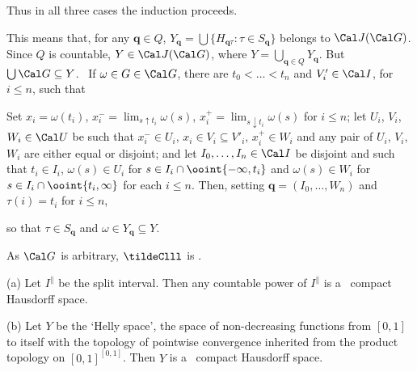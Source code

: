 {Thus in all three cases the induction proceeds.\ \Qed

\medskip

 This means that, for any $\pmb{q}\in Q$,
$Y_{\pmb{q}}=\bigcup\{H_{\pmb{q}\tau}:\tau\in S_{\pmb{q}}\}$ belongs to
$\Cal J(\Cal G)$.   Since $Q$ is countable, $Y\in\Cal J(\Cal G)$, where
$Y=\bigcup_{\pmb{q}\in Q}Y_{\pmb{q}}$.   But $\bigcup\Cal G\subseteq Y$.
\Prf\ If $\omega\in G\in\Cal G$, there are $t_0<\ldots<t_n$ and
$V'_i\in\Cal I$, for $i\le n$, such that


\noindent Set $x_i=\omega(t_i)$, $x^-_i=\lim_{s\uparrow t_i}\omega(s)$,
$x^+_i=\lim_{s\downarrow t_i}\omega(s)$ for $i\le n$;  let $U_i$, $V_i$,
$W_i\in\Cal U$ be such that $x^-_i\in U_i$, $x_i\in V_i\subseteq V'_i$,
$x^+_i\in W_i$ and any pair of $U_i$, $V_i$, $W_i$ are either equal or
disjoint;  and let $I_0,\ldots,I_n\in\Cal I$ be disjoint and such that
$t_i\in I_i$, $\omega(s)\in U_i$ for $s\in I_i\cap\ooint{-\infty,t_i}$ and
$\omega(s)\in W_i$ for $s\in I_i\cap\ooint{t_i,\infty}$ for each $i\le n$.
Then, setting $\pmb{q}=(I_0,\ldots,W_n)$ and $\tau(i)=t_i$ for $i\le n$,


\noindent so that $\tau\in S_{\pmb{q}}$ and
$\omega\in Y_{\pmb{q}}\subseteq Y$.\ \Qed

As $\Cal G$ is arbitrary, $\tildeClll $ is \hwtr.
}%

 (a) Let $I^{\|}$ be the split
interval.   Then any countable power of $I^{\|}$ is a
\hwtr\ compact Hausdorff space.

(b) Let $Y$ be the `Helly space', the space of non-decreasing functions
from $[0,1]$ to itself with the topology of pointwise convergence
inherited from the product topology on
$[0,1]^{[0,1]}$.
Then $Y$ is a \hwtr\ compact Hausdorff space.

\medskip


